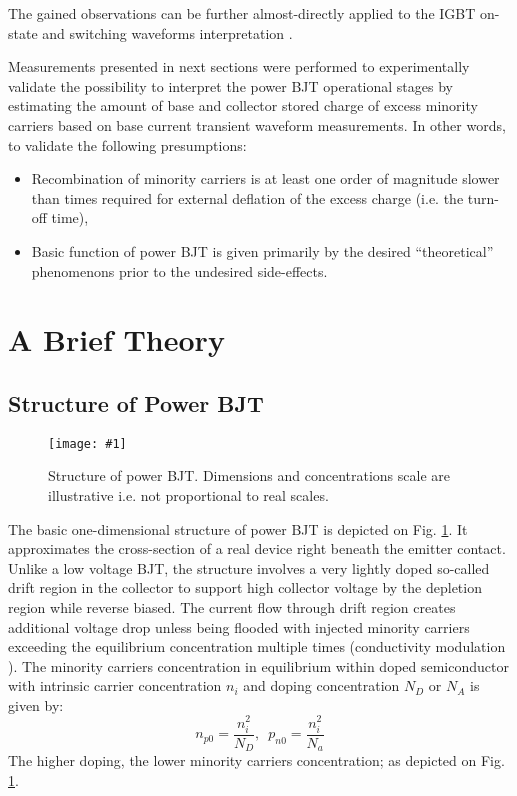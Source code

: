 \documentclass[conference]{IEEEtran}
\newcommand{\myfig}[3]
{
    \begin{figure}[!ht]
	\centering
	\texttt{[image: \#1]}
	\caption{#2}
	#3
    \end{figure}
}
\begin{document}
The gained observations can be further almost-directly applied to the IGBT on-state and switching waveforms interpretation \cite{baliga}.

Measurements presented in next sections were performed to experimentally validate the possibility to interpret the power BJT operational stages by estimating the amount of base and collector stored charge of excess minority carriers based on base current transient waveform measurements.
In other words, to validate the following presumptions:
\begin{itemize}
    \item Recombination of minority carriers is at least one order of magnitude slower than times required for external deflation of the excess charge (i.e. the turn-off time),
    \item Basic function of  power BJT is given primarily by the desired ``theoretical'' phenomenons prior to the undesired side-effects.
\end{itemize}


\section{A Brief Theory} \label{sec:theory}

\subsection{Structure of Power BJT} \label{sec:structure}

\myfig{struktura}{Structure of power BJT. Dimensions and concentrations scale are illustrative i.e. not proportional to real scales.}{\label{fig:struktura}}
The basic one-dimensional structure of power BJT is depicted on Fig. \ref{fig:struktura}. It approximates the cross-section of a real device right beneath the emitter contact. 
Unlike a low voltage BJT, the structure involves a very lightly doped so-called drift region in the collector to support high collector voltage by the depletion region while reverse biased. The current flow through drift region creates additional voltage drop  unless being flooded with injected minority carriers exceeding the equilibrium concentration multiple times (conductivity modulation \cite{baliga}).
The minority carriers concentration in equilibrium within doped semiconductor with intrinsic carrier concentration $n_i$ and doping concentration $N_D$ or $N_A$ is given by: 
\begin{equation}
    n_{p0} = \frac{n_i^2}{N_D}, \,\,\,p_{n0} = \frac{n_i^2}{N_a}
    \label{eq:equilibrium}
\end{equation}
The higher doping, the lower minority carriers concentration; as depicted on Fig. \ref{fig:struktura}.
\end{document}
